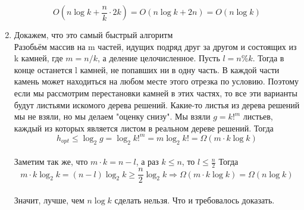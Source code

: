 \documentclass[12pt]{article}
\begin{document}
\begin{enumerate}
    $$O(n \log{k} + \frac{n}{k} \cdot 2k) = O(n \log{k} + 2n) = O(n\log{k}) $$
    \item Докажем, что это самый быстрый алгоритм \\
    Разобьём массив на m частей, идущих подряд друг за другом и состоящих из k камней, где $m = n/k$, а деление целочисленное. Пусть $l = n \% k$. Тогда в конце останется l камней, не попавших ни в одну часть. В каждой части камень может находиться на любом месте этого отрезка по условию. Поэтому если мы рассмотрим  перестановки камней в этих частях, то все эти варианты будут листьями искомого дерева решений. Какие-то листья из дерева решений мы не взяли, но мы делаем "оценку снизу". Мы взяли $g = k!^{m}$ листьев, каждый из которых является листом в реальном дереве решений. Тогда $$ h_{opt} \le \log_2{g} = \log_2{k!^{m}} = m \log_2{k!} = \Omega (m \cdot k \log{k}) $$ \\
    
    Заметим так же, что $m \cdot k = n - l$, а раз $ k \le n$, то $ l \le \frac{n}{2}$ Тогда 
	$$ m \cdot k \log_2{k} = (n-l) \log_2{k} \ge \frac{n}{2} \log_2{k} \Rightarrow \Omega (m \cdot k \log{k}) = \Omega (n \log{k}) $$  \\
	Значит, лучше, чем $n \log{k}$ сделать нельзя. Что и требовалось доказать.
    
\end{enumerate}
\end{document}

